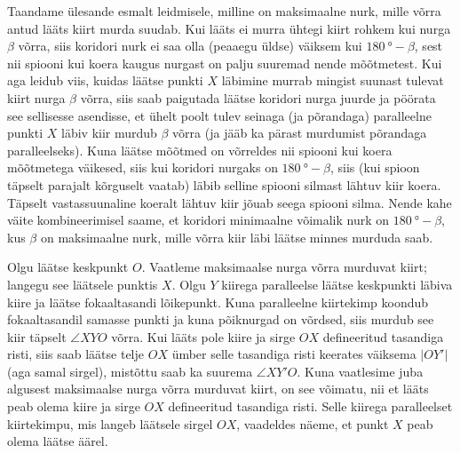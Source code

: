 \documentclass[10pt]{article}
\begin{document}

\solu
Taandame ülesande esmalt leidmisele, milline on maksimaalne nurk, mille võrra antud lääts kiirt murda suudab. Kui lääts ei murra ühtegi kiirt rohkem kui nurga $\beta$ võrra, siis koridori nurk ei saa olla (peaaegu üldse) väiksem kui $\SI{180}{\degree} - \beta$, sest nii spiooni kui koera kaugus nurgast on palju suuremad nende mõõtmetest. Kui aga leidub viis, kuidas läätse punkti $X$ läbimine murrab mingist suunast tulevat kiirt nurga $\beta$ võrra, siis saab paigutada läätse koridori nurga juurde ja pöörata see sellisesse asendisse, et ühelt poolt tulev seinaga (ja põrandaga) paralleelne punkti $X$ läbiv kiir murdub $\beta$ võrra (ja jääb ka pärast murdumist põrandaga paralleelseks). Kuna läätse mõõtmed on võrreldes nii spiooni kui koera mõõtmetega väikesed, siis kui koridori nurgaks on $\SI{180}{\degree} - \beta$, siis (kui spioon täpselt parajalt kõrguselt vaatab) läbib selline spiooni silmast lähtuv kiir koera. Täpselt vastassuunaline koeralt lähtuv kiir jõuab seega spiooni silma. Nende kahe väite kombineerimisel saame, et koridori minimaalne võimalik nurk on $\SI{180}{\degree}-\beta$, kus $\beta$ on maksimaalne nurk, mille võrra kiir läbi läätse minnes murduda saab. 

Olgu läätse keskpunkt $O$. Vaatleme maksimaalse nurga võrra murduvat kiirt; langegu see läätsele punktis $X$. Olgu $Y$ kiirega paralleelse läätse keskpunkti läbiva kiire ja läätse fokaaltasandi lõikepunkt. Kuna paralleelne kiirtekimp koondub fokaaltasandil samasse punkti ja kuna põiknurgad on võrdsed, siis murdub see kiir täpselt $\angle XYO$ võrra. Kui lääts pole kiire ja sirge $OX$ defineeritud tasandiga risti, siis saab läätse telje $OX$ ümber selle tasandiga risti keerates väiksema $|OY'|$ (aga samal sirgel), mistõttu saab ka suurema $\angle XY'O$. Kuna vaatlesime juba algusest maksimaalse nurga võrra murduvat kiirt, on see võimatu, nii et lääts peab olema kiire ja sirge $OX$ defineeritud tasandiga risti. Selle kiirega paralleelset kiirtekimpu, mis langeb läätsele sirgel $OX$, vaadeldes näeme, et punkt $X$ peab olema läätse äärel. 
\end{document}
